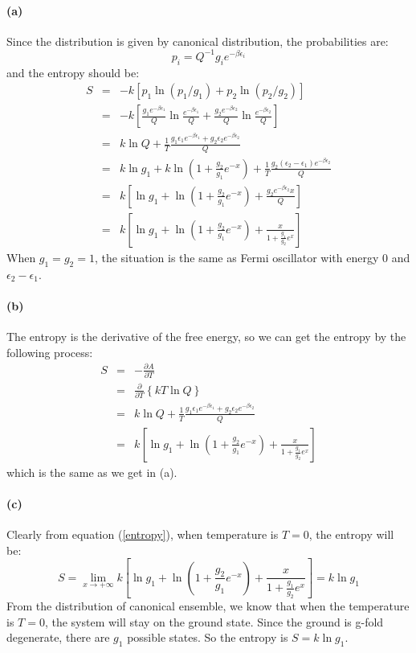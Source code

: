 \documentclass{article}
\begin{document}
\paragraph{(a)} Since the distribution is given by canonical distribution, the probabilities are:
$$
p_i = Q^{-1}g_ie^{-\beta \epsilon_i}
$$
and the entropy should be:
\begin{eqnarray}\label{entropy}
S &=& -k\left[p_1\ln(p_1/g_1)+p_2\ln(p_2/g_2)\right]\nonumber\\
&=& -k\left[\frac{g_1e^{-\beta \epsilon_1}}{Q}\ln \frac{e^{-\beta\epsilon_1}}{Q}+\frac{g_2e^{-\beta \epsilon_2}}{Q}\ln \frac{e^{-\beta\epsilon_2}}{Q}\right]\nonumber\\
&=& k\ln Q + \frac{1}{T}\frac{g_1\epsilon_1e^{-\beta\epsilon_1}+g_2\epsilon_2e^{-\beta\epsilon_2}}{Q}\nonumber\\
&=&k\ln g_1 + k\ln\left(1+\frac{g_2}{g_1}e^{-x}\right)+\frac{1}{T}\frac{g_2(\epsilon_2-\epsilon_1)e^{-\beta\epsilon_2}}{Q}\nonumber\\
&=&k\left[\ln g_1 + \ln\left(1+\frac{g_2}{g_1}e^{-x}\right)+\frac{g_2e^{-\beta\epsilon_2}x}{Q}\right]\nonumber\\
&=&k\left[\ln g_1 + \ln\left(1+\frac{g_2}{g_1}e^{-x}\right)+\frac{x}{1+\frac{g_1}{g_2}e^x}\right]
\end{eqnarray}
When $g_1=g_2=1$, the situation is the same as Fermi oscillator with energy $0$ and $\epsilon_2-\epsilon_1$.
\paragraph{(b)}
The entropy is the derivative of the free energy, so we can get the entropy by the following process:
\begin{eqnarray}
S &=& -\frac{\partial A}{\partial T}\nonumber\\
&=&\frac{\partial}{\partial T}\left\{kT\ln Q\right\}\nonumber\\
&=&k\ln Q +\frac{1}{T}\frac{g_1\epsilon_1e^{-\beta\epsilon_1}+g_2\epsilon_2e^{-\beta\epsilon_2}}{Q}\nonumber\\
&=&k\left[\ln g_1 + \ln\left(1+\frac{g_2}{g_1}e^{-x}\right)+\frac{x}{1+\frac{g_1}{g_2}e^x}\right]
\end{eqnarray}
which is the same as we get in (a).
\paragraph{(c)}
Clearly from equation (\ref{entropy}), when temperature is $T=0$, the entropy will be:
\begin{equation}
S = \lim_{x\rightarrow +\infty}k\left[\ln g_1 + \ln\left(1+\frac{g_2}{g_1}e^{-x}\right)+\frac{x}{1+\frac{g_1}{g_2}e^x}\right]=k\ln g_1
\end{equation}
From the distribution of canonical ensemble, we know that when the temperature is $T=0$, the system will stay on the ground state. Since the ground is g-fold degenerate, there are $g_1$ possible states. So the entropy is $S = k\ln g_1$.
\end{document}
